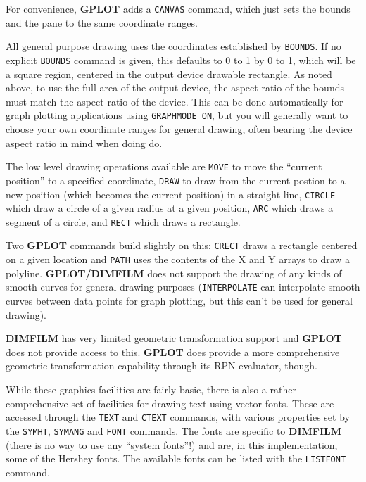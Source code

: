 \documentclass[a4paper,twoside,11pt]{article}
\newcommand{\newpara}{\par\vspace{4mm}\noindent}
\begin{document}
\newpara
For convenience, \textbf{GPLOT} adds a \texttt{CANVAS} command, which just sets
the bounds and the pane to the same coordinate ranges.

\newpara
All general purpose drawing uses the coordinates established by
\texttt{BOUNDS}. If no explicit \texttt{BOUNDS} command is given, this
defaults to 0 to 1 by 0 to 1, which will be a square region, centered in
the output device drawable rectangle. As noted above, to use the full
area of the output device, the aspect ratio of the bounds must match the
aspect ratio of the device. This can be done automatically for graph
plotting applications using \texttt{GRAPHMODE\ ON}, but you will
generally want to choose your own coordinate ranges for general drawing,
often bearing the device aspect ratio in mind when doing do.

\newpara
The low level drawing operations available are \texttt{MOVE} to move the
``current position'' to a specified coordinate, \texttt{DRAW} to draw
from the current postion to a new position (which becomes the current
position) in a straight line, \texttt{CIRCLE} which draw a circle of a
given radius at a given position, \texttt{ARC} which draws a segment of
a circle, and \texttt{RECT} which draws a rectangle.

\newpara
Two \textbf{GPLOT} commands build slightly on this: \texttt{CRECT} draws a
rectangle centered on a given location and \texttt{PATH} uses the
contents of the X and Y arrays to draw a polyline. \textbf{GPLOT/DIMFILM} does
not support the drawing of any kinds of smooth curves for general
drawing purposes (\texttt{INTERPOLATE} can interpolate smooth curves
between data points for graph plotting, but this can't be used for
general drawing).

\newpara
\textbf{DIMFILM} has very limited geometric transformation support and \textbf{GPLOT} does
not provide access to this. \textbf{GPLOT} does provide a more comprehensive
geometric transformation capability through its RPN evaluator, though.

\newpara
While these graphics facilities are fairly basic, there is also a rather
comprehensive set of facilities for drawing text using vector fonts.
These are accessed through the \texttt{TEXT} and \texttt{CTEXT}
commands, with various properties set by the \texttt{SYMHT},
\texttt{SYMANG} and \texttt{FONT} commands. The fonts are specific to
\textbf{DIMFILM} (there is no way to use any ``system fonts''!) and are, in this
implementation, some of the Hershey fonts. The available fonts can be
listed with the \texttt{LISTFONT} command.
\end{document}
